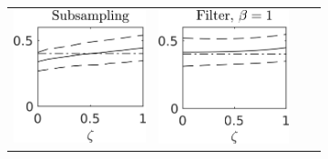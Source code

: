 \documentclass[10pt]{article}
\begin{document}
\begin{figure}[t]
	\vspace{0.5cm}
	\begin{subfigure}{\linewidth}
		\centering
		\begin{tabular}{cccc}
			\includegraphics[]{Figures/A_sub_s7.png} & \includegraphics[]{Figures/A_filt_s7_b1.png} &

\end{tabular}
\end{subfigure}
\end{figure}
\end{document}
